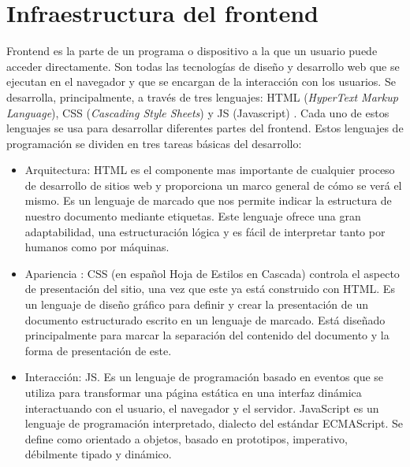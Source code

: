 \section{Infraestructura del frontend}

Frontend es la parte de un programa o dispositivo a la que un usuario puede acceder directamente. Son todas las tecnologías de diseño y desarrollo web que se ejecutan en el navegador y que se encargan de la interacción con los usuarios.  Se desarrolla, principalmente, a través de tres lenguajes: HTML (\textit{HyperText Markup Language}), CSS (\textit{Cascading Style Sheets})\citep{WEBSITE:26} y JS (Javascript)\citep{WEBSITE:27} . Cada uno de estos lenguajes se usa para desarrollar diferentes partes del frontend.  Estos lenguajes de programación se dividen en tres tareas básicas del desarrollo:

\begin{itemize}
	\item Arquitectura: HTML es el componente mas importante de cualquier proceso de desarrollo de sitios web y proporciona un marco general de cómo se verá el mismo. Es un lenguaje de marcado que nos permite indicar la estructura de nuestro documento mediante etiquetas. Este lenguaje ofrece una gran adaptabilidad, una estructuración lógica y es fácil de interpretar tanto por humanos como por máquinas.
	
	\item Apariencia : CSS (en español Hoja de Estilos en Cascada) controla el aspecto de presentación del sitio, una vez que este ya está construido con HTML.  Es un lenguaje de diseño gráfico para definir y crear la presentación de un documento estructurado escrito en un lenguaje de marcado. Está diseñado principalmente para marcar la separación del contenido del documento y la forma de presentación de este.
	
	\item Interacción: JS.  Es un lenguaje de programación basado en eventos que se utiliza para transformar una página estática en una interfaz dinámica interactuando con el usuario, el navegador y el servidor.  JavaScript es un lenguaje de programación interpretado, dialecto del estándar ECMAScript\citep{WEBSITE:28}.  Se define como orientado a objetos, basado en prototipos, imperativo, débilmente tipado y dinámico.
	
\end{itemize}

